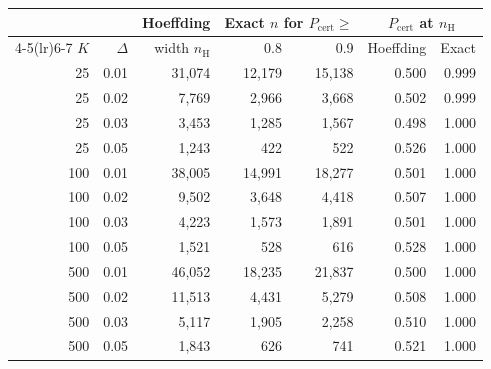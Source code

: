 \begin{tabular}{rrrrrrr}
\toprule
 & & Hoeffding & \multicolumn{2}{c}{Exact $n$ for $P_{\mathrm{cert}}\geq$} & \multicolumn{2}{c}{$P_{\mathrm{cert}}$ at $n_{\mathrm H}$} \\
\cmidrule(lr){4-5}\cmidrule(lr){6-7}
$K$ & $\Delta$ & width $n_{\mathrm H}$ & 0.8 & 0.9 & Hoeffding & Exact \\
\midrule
25 & 0.01 & 31,074 & 12,179 & 15,138 & 0.500 & 0.999 \\
25 & 0.02 & 7,769 & 2,966 & 3,668 & 0.502 & 0.999 \\
25 & 0.03 & 3,453 & 1,285 & 1,567 & 0.498 & 1.000 \\
25 & 0.05 & 1,243 & 422 & 522 & 0.526 & 1.000 \\
100 & 0.01 & 38,005 & 14,991 & 18,277 & 0.501 & 1.000 \\
100 & 0.02 & 9,502 & 3,648 & 4,418 & 0.507 & 1.000 \\
100 & 0.03 & 4,223 & 1,573 & 1,891 & 0.501 & 1.000 \\
100 & 0.05 & 1,521 & 528 & 616 & 0.528 & 1.000 \\
500 & 0.01 & 46,052 & 18,235 & 21,837 & 0.500 & 1.000 \\
500 & 0.02 & 11,513 & 4,431 & 5,279 & 0.508 & 1.000 \\
500 & 0.03 & 5,117 & 1,905 & 2,258 & 0.510 & 1.000 \\
500 & 0.05 & 1,843 & 626 & 741 & 0.521 & 1.000 \\
\bottomrule
\end{tabular}
